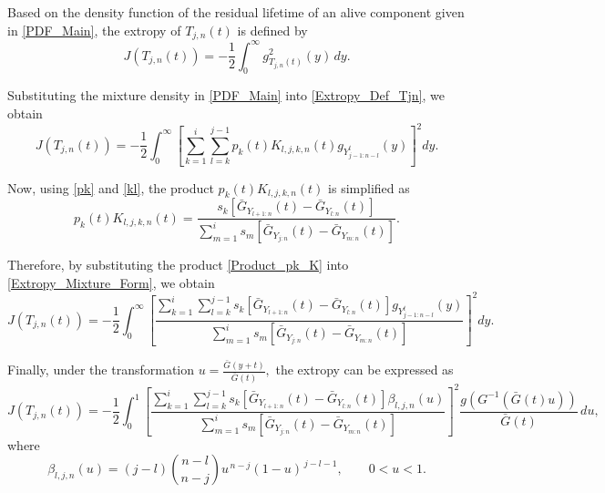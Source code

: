 \documentclass[twoside]{article}
\begin{document}
Based on the density function of the residual lifetime of an alive component given in \eqref{PDF_Main}, the extropy of $T_{j,n}(t)$ is defined by
\begin{equation}\label{Extropy_Def_Tjn}
J\left(T_{j,n}(t)\right)
=
-\frac{1}{2}
\int_{0}^{\infty}
g_{T_{j,n}(t)}^{2}(y)\,dy .
\end{equation}

Substituting the mixture density in \eqref{PDF_Main} into \eqref{Extropy_Def_Tjn}, we obtain
\begin{equation}\label{Extropy_Mixture_Form}
J\left(T_{j,n}(t)\right)
=
-\frac{1}{2}
\int_{0}^{\infty}
\left[
\sum_{k=1}^{i}
\sum_{l=k}^{j-1}
p_k(t)K_{l,j,k,n}(t)
g_{Y^t_{j-1:n-l}}(y)
\right]^2
dy .
\end{equation}

Now, using \eqref{pk} and \eqref{kl}, the product $p_k(t)K_{l,j,k,n}(t)$ is simplified as
\begin{equation}\label{Product_pk_K}
p_k(t)K_{l,j,k,n}(t)
=
\frac{
s_k\left[
\bar{G}_{Y_{l+1:n}}(t)
-
\bar{G}_{Y_{l:n}}(t)
\right]
}{
\sum\limits_{m=1}^{i}
s_m\left[
\bar{G}_{Y_{j:n}}(t)
-
\bar{G}_{Y_{m:n}}(t)
\right]
}.
\end{equation}

Therefore, by substituting the product \eqref{Product_pk_K} into \eqref{Extropy_Mixture_Form}, we obtain
\begin{equation}\label{Extropy_After_Product}
J\left(T_{j,n}(t)\right)
=
-\frac{1}{2}
\int_{0}^{\infty}
\left[
\frac{
\sum\limits_{k=1}^{i}
\sum\limits_{l=k}^{j-1}
s_k
\left[
\bar{G}_{Y_{l+1:n}}(t)
-
\bar{G}_{Y_{l:n}}(t)
\right]
g_{Y^t_{j-1:n-l}}(y)
}{
\sum\limits_{m=1}^{i}
s_m
\left[
\bar{G}_{Y_{j:n}}(t)
-
\bar{G}_{Y_{m:n}}(t)
\right]
}
\right]^2
dy .
\end{equation}

Finally, under the transformation
$
u=\frac{\bar{G}(y+t)}{\bar{G}(t)},
$
the extropy can be expressed as
\begin{equation}\label{Extropy_Final}
J\left(T_{j,n}(t)\right)
=
-\frac{1}{2}
\int_{0}^{1}
\left[
\frac{
\sum\limits_{k=1}^{i}
\sum\limits_{l=k}^{j-1}
s_k
\left[
\bar{G}_{Y_{l+1:n}}(t)
-
\bar{G}_{Y_{l:n}}(t)
\right]
\beta_{l,j,n}(u)
}{
\sum\limits_{m=1}^{i}
s_m
\left[
\bar{G}_{Y_{j:n}}(t)
-
\bar{G}_{Y_{m:n}}(t)
\right]
}
\right]^2
\frac{
g\left(G^{-1}\left(\bar{G}(t)u\right)\right)
}{
\bar{G}(t)
}
\,du ,
\end{equation}
where
\begin{equation}\label{beta_def}
\beta_{l,j,n}(u)
=
(j-l)\binom{n-l}{n-j}
u^{\,n-j}(1-u)^{\,j-l-1},
\qquad 0<u<1.
\end{equation}
\end{document}
